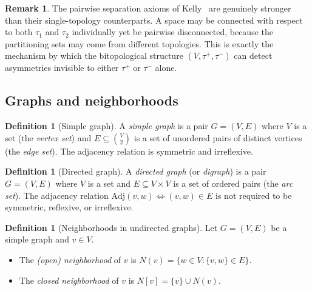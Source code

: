 \documentclass[11pt,a4paper]{article}
\theoremstyle{plain}
\theoremstyle{definition}
\newtheorem{definition}[theorem]{Definition}
\newtheorem{remark}[theorem]{Remark}
\newcommand{\Ncl}[1]{N[#1]}
\newcommand{\taufwd}{\tau^{+}}
\newcommand{\taubwd}{\tau^{-}}
\begin{document}
\begin{remark}\label{rem:pairwise-vs-single}
The pairwise separation axioms of Kelly~\cite{Kelly1963} are genuinely stronger
than their single-topology counterparts.  A space may be connected with respect
to both $\tau_1$ and $\tau_2$ individually yet be pairwise disconnected, because
the partitioning sets may come from different topologies.  This is exactly the
mechanism by which the bitopological structure $(V, \taufwd, \taubwd)$ can
detect asymmetries invisible to either $\taufwd$ or $\taubwd$ alone.
\end{remark}

\subsection{Graphs and neighborhoods}\label{subsec:graphs}

\begin{definition}[Simple graph]\label{def:simple-graph}
A \emph{simple graph} is a pair $G = (V, E)$ where $V$ is a set (the
\emph{vertex set}) and $E \subseteq \binom{V}{2}$ is a set of unordered pairs
of distinct vertices (the \emph{edge set}).  The adjacency relation is
symmetric and irreflexive.
\end{definition}

\begin{definition}[Directed graph]\label{def:digraph}
A \emph{directed graph} (or \emph{digraph}) is a pair $G = (V, E)$ where $V$
is a set and $E \subseteq V \times V$ is a set of ordered pairs (the
\emph{arc set}).  The adjacency relation $\mathrm{Adj}(v, w) \iff (v, w) \in E$
is not required to be symmetric, reflexive, or irreflexive.
\end{definition}

\begin{definition}[Neighborhoods in undirected graphs]\label{def:undirected-nhd}
Let $G = (V, E)$ be a simple graph and $v \in V$.
\begin{itemize}[nosep]
  \item The \emph{(open) neighborhood} of $v$ is
        $N(v) = \{w \in V : \{v, w\} \in E\}$.
  \item The \emph{closed neighborhood} of $v$ is
        $\Ncl{v} = \{v\} \cup N(v)$.
\end{itemize}
\end{definition}
\end{document}
